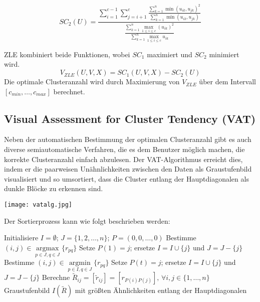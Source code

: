 \documentclass[11pt,ceqn]{book}
\DeclareMathOperator*{\argmax}{argmax}
\DeclareMathOperator*{\argmin}{argmin}
\begin{document}
$$SC_2(U) = \frac{\sum\limits_{i=1}^{c-1} \sum\limits_{j=i+1}^c\frac{\sum\limits_{k=1}^n \min(u_{ik},u_{jk})^2}{\sum\limits_{k=1}^n \min(u_{ik},u_{jk})}}{\frac{\sum\limits_{k=1}^n \max_{1\leqslant i \leqslant c}(u_{ik})^2}{\sum\limits_{k=1}^n \max_{1\leqslant i \leqslant c}u_{ik}}}$$ 

ZLE kombiniert beide Funktionen, wobei $SC_1$ maximiert und $SC_2$ minimiert wird.
$$V_{ZLE}(U,V,X) = SC_1(U,V,X)-SC_2(U)$$
Die optimale Clusteranzahl wird durch Maximierung von
$V_{ZLE}$ über dem Intervall $\left[c_{min},\dots,c_{max}\right]$ berechnet.


\subsection{Visual Assessment for Cluster Tendency (VAT)}
\begin{minipage}{0.35\textwidth}\raggedright
Neben der automatischen Bestimmung der optimalen Clusteranzahl gibt es auch diverse semiautomatische Verfahren, die es dem Benutzer möglich machen, die korrekte Clusteranzahl einfach abzulesen. Der VAT-Algorithmus erreicht dies, indem er die paarweisen Unähnlichkeiten zwischen den Daten als Graustufenbild visualisiert und so umsortiert, dass die Cluster entlang der Hauptdiagonalen als dunkle Blöcke zu erkennen sind.
\end{minipage}
\hfill
\begin{minipage}{0.6\textwidth}
\texttt{[image: vatalg.jpg]}
\end{minipage}
 
\vspace{\belowdisplayskip}

Der Sortierprozess kann wie folgt beschrieben werden:
\begin{algorithm}[H]
\caption{$VAT(R)$}\label{vatalg}
\begin{algorithmic}[1]
\State Initialisiere $I=\emptyset$; $J=\{1,2,\dots,n\}$; $P = (0,0,\dots,0)$
\State Bestimme $(i,j)\in \argmax\limits_{p\in J, q\in J}\{r_{pq}\}$
\State Setze $P(1)=j$; ersetze $I = I \cup \{j\}$ und $J = J - \{j\}$
\State Bestimme $(i,j) \in \argmin\limits_{p\in I, q\in J}\{r_{pq}\}$
\State Setze $P(t) = j$; ersetze $I = I \cup \{j\}$ und $J = J - \{j\}$
\EndFor
\State Berechne $\tilde{R}_{ij} = \left[\tilde{r}_{ij}\right] = \left[r_{P(i)P(j)}\right],\, \forall i,j \in \{1,\dots,n\}$
\State \Return Graustufenbild $I(\tilde{R})$ mit größten Ähnlichkeiten entlang der Hauptdiagonalen
\end{algorithmic}
\end{algorithm}
\end{document}

